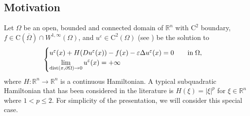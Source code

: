 \documentclass[11pt,reqno]{amsart}
\numberwithin{figure}{section}
\theoremstyle{plain}
\theoremstyle{remark}
\numberwithin{equation}{section}
\newcommand{\R}{\mathbb{R}}
\begin{document}
\subsection{Motivation} Let $\Omega$ be an open, bounded and connected domain of $\mathbb{R}^n$ with $\mathrm{C}^2$ boundary, %
 $f\in \mathrm{C}(\overline{\Omega})\cap W^{1,\infty}(\Omega)$, and $u^\varepsilon\in \mathrm{C}^2(\Omega)$ (see \cite{Lasry1989}) be the solution to
 \begin{equation}\label{eq:PDEepsa}
    \begin{cases}
      u^\varepsilon(x) + H(Du^\varepsilon(x)) - f(x) - \varepsilon \Delta u^\varepsilon(x) = 0 \qquad
    \text{in}\;\Omega, \vspace{0cm}\\
    \displaystyle  \lim_{\mathrm{dist}(x,\partial \Omega)\to 0} u^\varepsilon(x) = +\infty
    \end{cases} 
\end{equation}
 where $H:\R^n\to\R^n$ is a continuous Hamiltonian. A typical subquadratic Hamiltonian that has been considered in the literature is $H(\xi) = |\xi|^p$ for $\xi\in \R^n$ where $1<p\leq 2$. For simplicity of the presentation, we will consider this special case.  
 
\end{document}
